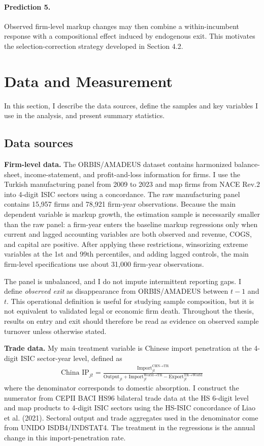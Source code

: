 \documentclass[12pt]{article}
\begin{document}
\paragraph{Prediction 5.} Observed firm-level markup changes may then combine a within-incumbent response with a compositional effect induced by endogenous exit. This motivates the selection-correction strategy developed in Section 4.2.

\section{Data and Measurement}
In this section, I describe the data sources, define the samples and key variables I use in the analysis, and present summary statistics.

\subsection{Data sources}
\textbf{Firm-level data.} The ORBIS/AMADEUS dataset contains harmonized balance-sheet, income-statement, and profit-and-loss information for firms. I use the Turkish manufacturing panel from 2009 to 2023 and map firms from NACE Rev.2 into 4-digit ISIC sectors using a concordance. The raw manufacturing panel contains 15,957 firms and 78,921 firm-year observations. Because the main dependent variable is markup growth, the estimation sample is necessarily smaller than the raw panel: a firm-year enters the baseline markup regressions only when current and lagged accounting variables are both observed and revenue, COGS, and capital are positive. After applying these restrictions, winsorizing extreme variables at the 1st and 99th percentiles, and adding lagged controls, the main firm-level specifications use about 31,000 firm-year observations.

The panel is unbalanced, and I do not impute intermittent reporting gaps. I define \emph{observed exit} as disappearance from ORBIS/AMADEUS between $t-1$ and $t$. This operational definition is useful for studying sample composition, but it is not equivalent to validated legal or economic firm death. Throughout the thesis, results on entry and exit should therefore be read as evidence on observed sample turnover unless otherwise stated.

\textbf{Trade data.} My main treatment variable is Chinese import penetration at the 4-digit ISIC sector-year level, defined as
\begin{equation}
    \begin{aligned}
    \text{China IP}_{jt} = \frac{\text{Import}_{jt}^{\text{CHN} \to \text{TR}}}{\text{Output}_{jt} + \text{Import}_{jt}^{\text{World} \to \text{TR}} - \text{Export}_{jt}^{\text{TR} \to \text{World}}} 
\end{aligned}
\end{equation}
where the denominator corresponds to domestic absorption. I construct the numerator from CEPII BACI HS96 bilateral trade data at the HS 6-digit level and map products to 4-digit ISIC sectors using the HS-ISIC concordance of Liao et al. (2021). Sectoral output and trade aggregates used in the denominator come from UNIDO ISDB4/INDSTAT4. The treatment in the regressions is the annual change in this import-penetration rate.
\end{document}
